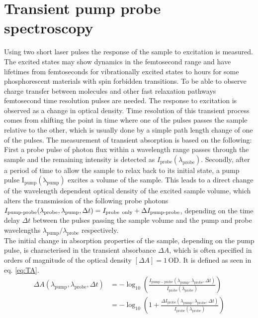 \documentclass[twoside,openright,listof=numbered]{scrreprt}
\begin{document}
\section{Transient pump probe spectroscopy}
Using two short laser pulses the response of the sample to excitation is measured. The excited states may show dynamics in the femtosecond range and have lifetimes from femtoseconds for vibrationally excited states to hours for some phosphorescent materials with spin forbidden transitions.\cite{Zewail2000} To be able to observe charge transfer between molecules and other fast relaxation pathways femtosecond time resolution pulses are needed. The response to excitation is observed as a change in optical density. Time resolution of this transient process comes from shifting the point in time where one of the pulses passes the sample relative to the other, which is usually done by a simple path length change of one of the pulses.\newline
The measurement of transient absorption is based on the following: First a probe pulse of photon flux within a wavelength range passes through the sample and the remaining intensity is detected as $I_\text{probe}(\lambda_\text{probe})$. 
Secondly, after a period of time to allow the sample to relax back to its initial state, a pump pulse $\mathrm{I_{pump}(\lambda_{pump})}$ excites a volume of the sample. This leads to a direct change of the wavelength dependent optical density of the excited sample volume, which alters the transmission of the following probe photons $I_\text{pump-probe}(\lambda_\text{probe}, \lambda_\text{pump}, \Delta t) = I_\text{probe\, only}+\Delta I_\text{pump-probe}$, depending on the time delay $\Delta t$ between the pulses passing the sample volume and the pump and probe wavelengths $\lambda_\text{pump}/\lambda_\text{probe}$ respectively. \\
The initial change in absorption properties of the sample, depending on the pump pulse, is characterised in the transient absorbance $\Delta A$, which is often specified in orders of magnitude of the optical density $\left[\Delta A\right] = 1\, \text{OD}$. It is defined as seen in eq. \ref{eq:TA}.
\begin{equation}\label{eq:TA}
\begin{split}
\Delta A(\lambda_{\mathrm{pump}}, \lambda_{\mathrm{probe}}, \Delta t)&=-\log _{10}\left(\frac{I_{\mathrm{pump}-\mathrm{probe}}\left(\lambda_{\mathrm{pump}}, \lambda_{\mathrm{probe}}, \Delta t\right)}{I_{\mathrm{probe}}\left(\lambda_{\mathrm{probe}}\right)}\right)\\
&=-\log _{10}\left(1+\frac{\Delta I_{\mathrm{probe}}\left(\lambda_{\mathrm{pump}}, \lambda_{\mathrm{probe}}, \Delta t\right)}{I_{\mathrm{probe}}\left(\lambda_{\mathrm{probe}}\right)}\right)
\end{split}
\end{equation}
\end{document}
